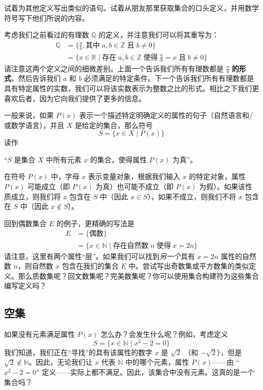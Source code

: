 试着为其他定义写出类似的语句。试着从朋友那里获取集合的口头定义，并用数学符号写下他们所说的内容。

考虑我们之前看过的有理数 $\mathbb{Q}$ 的定义，并注意我们可以将其重写为：
\begin{align*}
    \mathbb{Q} &= \Big\{\frac{a}{b}, \text{其中}\; a,b \in \mathbb{Z} \;\text{且}\; b \ne 0\Big\}\\
               &= \Big\{x \in \mathbb{R} \mid \text{存在}\; a, b \in \mathbb{Z} \;\text{使得}\; \frac{a}{b}= x \;\text{且}\; b \ne 0\Big\}
\end{align*}
请注意这两个定义之间的细微差别。上面一个告诉我们所有有理数都是 $\frac{a}{b}$ \textbf{的形式}，然后告诉我们 $a$ 和 $b$ 必须满足的特定条件。下一个告诉我们所有有理数都是具有特定属性的实数，我们可以将该实数表示为整数之比的形式。相比之下我们更喜欢后者，因为它向我们提供了更多的信息。

一般来说，如果 $P(x)$ 表示一个描述特定明确定义的属性的句子（自然语言和/或数学语言），并且 $X$ 是给定的集合，那么符号
\[S = \{x \in X \mid P(x)\}\]
读作
\begin{center}``$S$ 是集合 $X$ 中所有元素 $x$ 的集合，使得属性 $P(x)$ 为真''。\end{center}
在符号 $P(x)$ 中，字母 $x$ 表示变量对象，根据我们输入 $x$ 的特定对象，属性 $P(x)$ 可能成立（即 $P(x)$ 为真）也可能不成立（即 $P (x)$ 为假）。如果该性质成立，则我们将 $x$ 包含在 $S$ 中（因此 $x \in S$），如果不成立，则我们不将 $x$ 包含在 $S$ 中（因此 $x \notin S$）。

回到偶数集合 $E$ 的例子，更精确的写法是
\begin{align*}
    E &= \{\text{偶数}\} \\
      &= \{x \in \mathbb{N} \mid \text{存在自然数}\; n \;\text{使得}\; x = 2n\}
\end{align*}
请注意，这里有两个属性``层''。如果我们可以找到\emph{另一个}具有 $x = 2n$ 属性的自然数 $n$，则自然数 $x$ 包含在我们的集合 $E$ 中。尝试写出奇数集或平方数集的类似定义。那么质数集呢？回文数集呢？完美数集呢？你可以使用集合构建符为这些集合编写定义吗？

\subsection{空集}

如果没有元素满足属性 $P(x)$ 怎么办？会发生什么呢？例如，考虑定义
\[S = \{x \in \mathbb{N} \mid x^2 - 2 = 0\}\]
我们知道，我们正在``寻找''的具有该属性的数字 $x$ 是 $\sqrt{2}$ （和 $-\sqrt{2}$），但是 $\sqrt{2} \notin \mathbb{N}$。因此，无论我们让 $x$ 代表 $\mathbb{N}$ 中的哪个元素，属性 $P(x)$——由 ``$x^2 - 2 = 0$'' 定义——实际上都不满足。因此，该集合中没有元素。这真的是一个集合吗？

